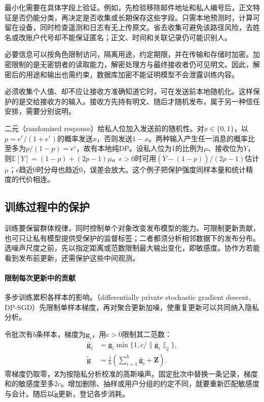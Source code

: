 最小化需要在具体字段上验证。例如，先检验移除邮件地址和私人编号后，正文特征是否仍能分类，再决定是否收集或长期保存这些字段。只需本地预测时，计算可留在设备，同时检查遥测和日志有无上传原文。省去收集可避免该路径风险，去姓名或改账户代号却不能保证匿名；正文、时间和关联记录仍可能识别人。

必要信息可以按角色限制访问，隔离用途，约定期限，并在传输和存储时加密。加密限制的是无密钥者的读取能力，解密处理方与最终接收者仍可见明文。因此，解密后的用途和输出也需约束，数据库加密不能证明模型不会泄露训练内容。

必须收集个人值、却不应让接收方准确知道它时，可在发送前本地随机化。这样保护的是交给接收方的输入。接收方先持有明文、随后才随机发布，属于另一种信任安排，需要分别说明。

二元（randomized response）给私人位加入发送前的随机性。对$x\in\{0,1\}$，以$p=e^\epsilon/(1+e^\epsilon)$的概率发送$x$，否则发送$1-x$。两种输入产生任一消息的概率比至多为$p/(1-p)=e^\epsilon$，故有本地纯DP。设私人位为1的比例为$\mu$、接收位为$Y$，则$\mathbb E[Y]=(1-p)+(2p-1)\mu$。$\epsilon>0$时可用$(\bar Y-(1-p))/(2p-1)$估计$\mu$；$\epsilon$趋近0时分母也趋近0，误差会放大。这个例子把保护强度同样本量和统计精度的代价相连。

\subsection{训练过程中的保护}
\label{sec:privacy-training-influence}

训练要保留群体规律，同时控制单个对象改变发布模型的能力。可限制更新贡献，也可只让私有模型提供受保护的监督标签；二者都须分析相邻数据下的发布分布。选噪声尺度之前，先以指定距离或范数限制最大输出变化，即敏感度。协作方若能看到发布前更新，还需保护这些中间观测。

\paragraph{限制每次更新中的贡献}

多步训练累积各样本的影响。（differentially private stochastic gradient descent, DP-SGD）先限制单样本梯度，再对聚合更新加噪，使重复更新可以共同纳入隐私分析。

令批次有$b$条样本，梯度为$\bm g_i$，用$c>0$限制其二范数：
\begin{equation}
 \begin{aligned}
 \bar{\bm g}_i
 &=\bm g_i\min\{1,c/\lVert\bm g_i\rVert_2\},\\
 \tilde{\bm g}
 &=\frac{1}{b}\left(\sum_{i=1}^{b}\bar{\bm g}_i+\bm Z\right).
 \end{aligned}
 \label{eq:privacy-dpsgd}
\end{equation}
零梯度仍取零，$\bm Z$为按隐私分析校准的高斯噪声。固定批次中替换一条记录，梯度和的敏感度至多$2c$。增加删除、抽样或用户分组的约定不同，就要重新匹配敏感度与会计。随后以$\tilde{\bm g}$更新，登记各步消耗。

